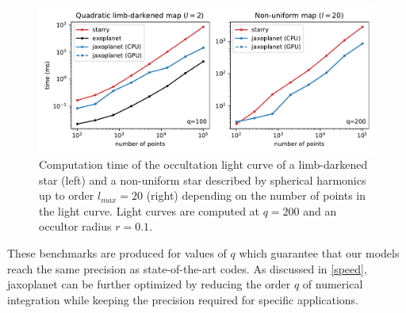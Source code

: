 \documentclass[modern]{aastex631}
\begin{document}
\begin{figure}[H]
    \begin{center}
        \includegraphics[width=\textwidth]{../workflows/figures/speed_vs_N.pdf}
        \caption{Computation time of the occultation light curve of a limb-darkened star (left) and a non-uniform star described by spherical harmonics up to order $l_{max}=20$ (right) depending on the number of points in the light curve. Light curves are computed at $q=200$ and an occultor radius $r=0.1$. }
        \label{fig:speed_N}
    \end{center}
\end{figure}
These benchmarks are produced for values of $q$ which guarantee that our models reach the same precision as state-of-the-art codes. As discussed in \autoref{speed}, \textsf{jaxoplanet} can be further optimized by reducing the order $q$ of numerical integration while keeping the precision required for specific applications.

\end{document}
